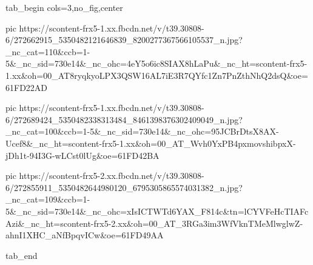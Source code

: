  
 
 
 
 


\ifcmt
  tab_begin cols=3,no_fig,center

     pic https://scontent-frx5-1.xx.fbcdn.net/v/t39.30808-6/272662915_5350482121646839_8200277367566105537_n.jpg?_nc_cat=110&ccb=1-5&_nc_sid=730e14&_nc_ohc=4eY5o6ic8SIAX8hLaPu&_nc_ht=scontent-frx5-1.xx&oh=00_AT8ryqkyoLPX3QSW16AL7iE3R7QYfc1Zn7PnZthNhQ2dsQ&oe=61FD22AD

     pic https://scontent-frx5-1.xx.fbcdn.net/v/t39.30808-6/272689424_5350482338313484_8461398376302409049_n.jpg?_nc_cat=100&ccb=1-5&_nc_sid=730e14&_nc_ohc=95JCBrDtsX8AX-Ucef8&_nc_ht=scontent-frx5-1.xx&oh=00_AT_Wvh0YxPB4pxmovshibpxX-jDh1t-94I3G-wLCst0lUg&oe=61FD42BA

     pic https://scontent-frx5-2.xx.fbcdn.net/v/t39.30808-6/272855911_5350482644980120_6795305865574031382_n.jpg?_nc_cat=109&ccb=1-5&_nc_sid=730e14&_nc_ohc=xIsICTWTd6YAX_F814c&tn=lCYVFeHcTIAFcAzi&_nc_ht=scontent-frx5-2.xx&oh=00_AT_3RGa3im3WfVknTMeMlwglwZ-ahnI1XHC_aNfBpqvICw&oe=61FD49AA

  tab_end
\fi
